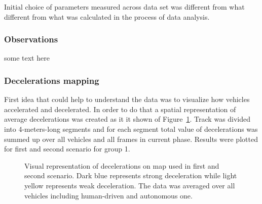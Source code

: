 \documentclass[11pt,english]{article}
\begin{document}
Initial choice of parameters measured across data set was different from what different from what was calculated in the process of data analysis.



\subsubsection{Observations}

some text here


\subsubsection*{Decelerations mapping}

First idea that could help to understand the data was to visualize how vehicles accelerated and decelerated. In order to do that a spatial representation of average decelerations was created as it it shown of Figure~\ref{fig:decelerations1}. Track was divided into 4-meters-long segments and for each segment total value of decelerations was summed up over all vehicles and all frames in current phase. Results were plotted for first and second scenario for group 1.


\begin{figure}[h]
\centering
{}


\caption{Visual representation of decelerations on map used in first and second scenario. Dark blue represents strong deceleration while light yellow represents weak deceleration. The data was averaged over all vehicles including human-driven and autonomous one.}
\label{fig:decelerations1}
\end{figure}
\end{document}

